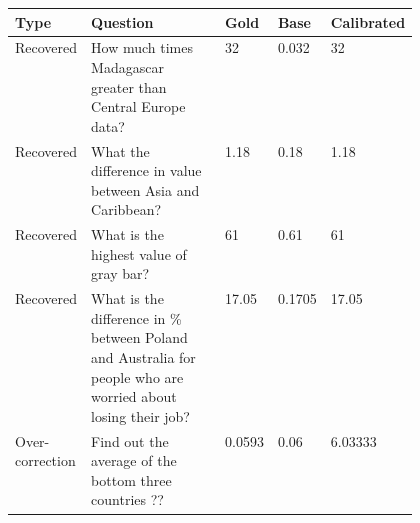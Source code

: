\begin{tabular}{lp{0.47\linewidth}lll}
\toprule
Type & Question & Gold & Base & Calibrated \\
\midrule
Recovered & How much times Madagascar greater than Central Europe data? & 32 & 0.032 & 32 \\
Recovered & What the difference in value between Asia and Caribbean? & 1.18 & 0.18 & 1.18 \\
Recovered & What is the highest value of gray bar? & 61 & 0.61 & 61 \\
Recovered & What is the difference in \% between Poland and Australia for people who are worried about losing their job? & 17.05 & 0.1705 & 17.05 \\
Over-correction & Find out the average of the bottom three countries ?? & 0.0593 & 0.06 & 6.03333 \\
\bottomrule
\end{tabular}

